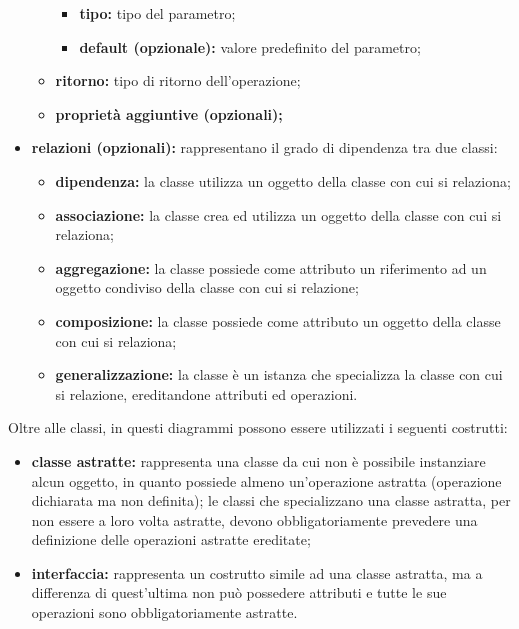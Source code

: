 \begin{itemize}[leftmargin=1.5cm]
\begin{itemize}
\begin{itemize}
									\item \textbf{tipo:} tipo del parametro;
									\item \textbf{default (opzionale):} valore predefinito del parametro;
								\end{itemize}
								\item \textbf{ritorno:} tipo di ritorno dell'operazione;
								\item \textbf{proprietà aggiuntive (opzionali);}
							\end{itemize}
							\item \textbf{relazioni (opzionali):} rappresentano il grado di dipendenza tra due classi:
							\begin{itemize}
								\item \textbf{dipendenza:} la classe utilizza un oggetto della classe con cui si relaziona;
								\item \textbf{associazione:} la classe crea ed utilizza un oggetto della classe con cui si relaziona;
								\item \textbf{aggregazione:} la classe possiede come attributo un riferimento ad un oggetto condiviso della classe con cui si relazione;
								\item \textbf{composizione:} la classe possiede come attributo un oggetto della classe con cui si relaziona;
								\item \textbf{generalizzazione:} la classe è un istanza che specializza la classe con cui si relazione, ereditandone attributi ed operazioni.
							\end{itemize}
						\end{itemize}

						\hangindent=0.6cm Oltre alle classi, in questi diagrammi possono essere utilizzati i seguenti costrutti:
						\begin{itemize}[leftmargin=1.5cm]
							\item \textbf{classe astratte:} rappresenta una classe da cui non è possibile instanziare alcun oggetto, in quanto possiede almeno un'operazione astratta (operazione dichiarata ma non definita); le classi che specializzano una classe astratta, per non essere a loro volta astratte, devono obbligatoriamente prevedere una definizione delle operazioni astratte ereditate;
							\item \textbf{interfaccia:} rappresenta un costrutto simile ad una classe astratta, ma a differenza di quest'ultima non può possedere attributi e tutte le sue operazioni sono obbligatoriamente astratte.
						\end{itemize}
						
